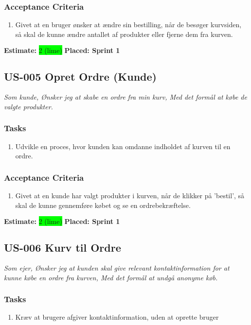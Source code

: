 \subsubsection*{\textbf{Acceptance Criteria}}
\begin{enumerate}
  \item Givet at en bruger ønsker at ændre sin bestilling, når de besøger kurvsiden, så skal de kunne ændre antallet af produkter eller fjerne dem fra kurven.
\end{enumerate}
\textbf{Estimate:} \colorbox{lime}{2 (lime)}
\textbf{Placed: Sprint 1}
\par\noindent\dotfill

\subsection{US-005 Opret Ordre (Kunde)}
\label{sec:US-005}
\textit{Som kunde, Ønsker jeg at skabe en ordre fra min kurv, Med det formål at købe de valgte produkter.}
\subsubsection*{\textbf{Tasks}}
\begin{enumerate}
  \item Udvikle en proces, hvor kunden kan omdanne indholdet af kurven til en ordre.
\end{enumerate}
\subsubsection*{\textbf{Acceptance Criteria}}
\begin{enumerate}
  \item Givet at en kunde har valgt produkter i kurven, når de klikker på 'bestil', så skal de kunne gennemføre købet og se en ordrebekræftelse.
\end{enumerate}
\textbf{Estimate:} \colorbox{lime}{2 (lime)}
\textbf{Placed: Sprint 1}
\par\noindent\dotfill

\subsection{US-006 Kurv til Ordre}
\label{sec:US-006}
\textit{Som ejer, Ønsker jeg at kunden skal give relevant kontaktinformation for at kunne købe en ordre fra kurven, Med det formål at undgå anonyme køb.}
\subsubsection*{\textbf{Tasks}}
\begin{enumerate}
  \item Kræv at brugere afgiver kontaktinformation, uden at oprette bruger
\end{enumerate}
